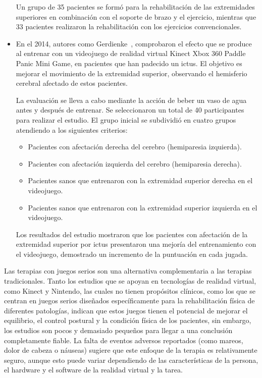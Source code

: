 \begin{itemize}
    Un grupo de 35 pacientes se formó para la rehabilitación de las extremidades superiores en combinación con el soporte de brazo y el ejercicio, mientras que 33 pacientes realizaron la rehabilitación con los ejercicios convencionales.
    
    \item En el 2014, autores como Gerdienke~\cite{10.3233/NRE-141105}, comprobaron el efecto que se produce al entrenar con un videojuego de realidad virtual Kinect Xbox 360 Paddle Panic Mini Game, en pacientes que han padecido un ictus. El objetivo es mejorar el movimiento de la extremidad superior, observando el hemisferio cerebral afectado de estos pacientes.

    La evaluación se lleva a cabo mediante la acción de beber un vaso de agua antes y después de entrenar. Se seleccionaron un total de 40 participantes para realizar el estudio. El grupo inicial se subdividió en cuatro grupos atendiendo a los siguientes criterios:

    \begin{itemize}
        \item Pacientes con afectación derecha del cerebro (hemiparesia izquierda).
        \item Pacientes con afectación izquierda del cerebro (hemiparesia derecha).
        \item Pacientes sanos que entrenaron con la extremidad superior derecha en el videojuego.
        \item Pacientes sanos que entrenaron con la extremidad superior izquierda en el videojuego.
    \end{itemize}

    Los resultados del estudio mostraron que los pacientes con afectación de la extremidad superior por ictus presentaron una mejoría del entrenamiento con el videojuego, demostrado un incremento de la puntuación en cada jugada.
\end{itemize}

Las terapias con juegos serios son una alternativa complementaria a las terapias tradicionales. Tanto los estudios que se apoyan en tecnologías de realidad virtual, como Kinect y Nintendo, las cuales no tienen propósitos clínicos, como los que se centran en juegos serios diseñados específicamente para la rehabilitación física de diferentes patologías, indican que estos juegos tienen el potencial de mejorar el equilibrio, el control postural y la condición física de los pacientes, sin embargo, los estudios son pocos y demasiado pequeños para llegar a una conclusión completamente fiable. La falta de eventos adversos reportados (como mareos, dolor de cabeza o náuseas) sugiere que este enfoque de la terapia es relativamente seguro, aunque esto puede variar dependiendo de las características de la persona, el hardware y el software de la realidad virtual y la tarea. 